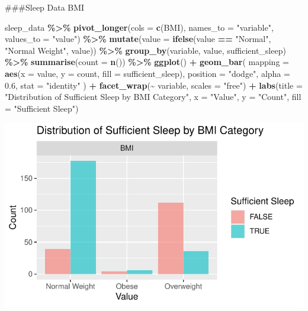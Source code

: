 \documentclass[
  11pt,
]{article}
\newenvironment{Shaded}{\begin{snugshade}}{\end{snugshade}}
\newcommand{\AttributeTok}[1]{\textcolor[rgb]{0.13,0.29,0.53}{#1}}
\newcommand{\FloatTok}[1]{\textcolor[rgb]{0.00,0.00,0.81}{#1}}
\newcommand{\FunctionTok}[1]{\textcolor[rgb]{0.13,0.29,0.53}{\textbf{#1}}}
\newcommand{\NormalTok}[1]{#1}
\newcommand{\SpecialCharTok}[1]{\textcolor[rgb]{0.81,0.36,0.00}{\textbf{#1}}}
\newcommand{\StringTok}[1]{\textcolor[rgb]{0.31,0.60,0.02}{#1}}
\begin{document}
\#\#\#Sleep Data BMI

\begin{Shaded}
\begin{Highlighting}[]
\NormalTok{sleep\_data }\SpecialCharTok{\%\textgreater{}\%}
  \FunctionTok{pivot\_longer}\NormalTok{(}\AttributeTok{cols =} \FunctionTok{c}\NormalTok{(BMI), }\AttributeTok{names\_to =} \StringTok{"variable"}\NormalTok{, }\AttributeTok{values\_to =} \StringTok{"value"}\NormalTok{) }\SpecialCharTok{\%\textgreater{}\%}
  \FunctionTok{mutate}\NormalTok{(}\AttributeTok{value =} \FunctionTok{ifelse}\NormalTok{(value }\SpecialCharTok{==} \StringTok{"Normal"}\NormalTok{, }\StringTok{"Normal Weight"}\NormalTok{, value)) }\SpecialCharTok{\%\textgreater{}\%}
  \FunctionTok{group\_by}\NormalTok{(variable, value, sufficient\_sleep) }\SpecialCharTok{\%\textgreater{}\%}
  \FunctionTok{summarise}\NormalTok{(}\AttributeTok{count =} \FunctionTok{n}\NormalTok{()) }\SpecialCharTok{\%\textgreater{}\%}
  \FunctionTok{ggplot}\NormalTok{() }\SpecialCharTok{+}
  \FunctionTok{geom\_bar}\NormalTok{(}
    \AttributeTok{mapping =} \FunctionTok{aes}\NormalTok{(}\AttributeTok{x =}\NormalTok{ value, }\AttributeTok{y =}\NormalTok{ count, }\AttributeTok{fill =}\NormalTok{ sufficient\_sleep),}
    \AttributeTok{position =} \StringTok{"dodge"}\NormalTok{,   }
    \AttributeTok{alpha =} \FloatTok{0.6}\NormalTok{,}
    \AttributeTok{stat =} \StringTok{"identity"}
\NormalTok{  ) }\SpecialCharTok{+}
  \FunctionTok{facet\_wrap}\NormalTok{(}\SpecialCharTok{\textasciitilde{}}\NormalTok{ variable, }\AttributeTok{scales =} \StringTok{"free"}\NormalTok{) }\SpecialCharTok{+}
  \FunctionTok{labs}\NormalTok{(}\AttributeTok{title =} \StringTok{"Distribution of Sufficient Sleep by BMI Category"}\NormalTok{,}
       \AttributeTok{x =} \StringTok{"Value"}\NormalTok{, }
       \AttributeTok{y =} \StringTok{"Count"}\NormalTok{, }
       \AttributeTok{fill =} \StringTok{"Sufficient Sleep"}\NormalTok{)}
\end{Highlighting}
\end{Shaded}

\begin{center}\includegraphics[width=0.7\linewidth]{SleepHelath_files/figure-latex/unnamed-chunk-44-1} \end{center}
\end{document}
